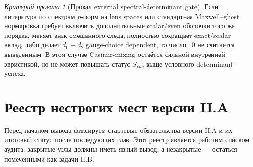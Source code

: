 \documentclass[12pt,a4paper]{report}
\theoremstyle{remark}
\newtheorem{nogocriterion}{Критерий провала}[chapter]
\begin{document}
\begin{nogocriterion}[Провал external spectral-determinant gate]
Если литература по спектрам \(p\)-форм на lens spaces или стандартная Maxwell--ghost нормировка требует включить дополнительные scalar/even оболочки того же порядка, меняет знак смешанного следа, полностью сокращает exact/scalar вклад, либо делает \(d_0+d_2\) gauge-choice dependent, то число \(10\) не считается выведенным. В этом случае Casimir-mixing остаётся сильной внутренней эвристикой, но не может повышать статус \(S_{vac}\) выше условного determinant-успеха.
\end{nogocriterion}

\section*{Реестр нестрогих мест версии II.A}

Перед началом вывода фиксируем стартовые обязательства версии II.A и их итоговый статус после последующих глав. Этот реестр является рабочим списком аудита: закрытые узлы должны иметь явный вывод, а незакрытые --- остаться помеченными как задачи II.B.
\end{document}
